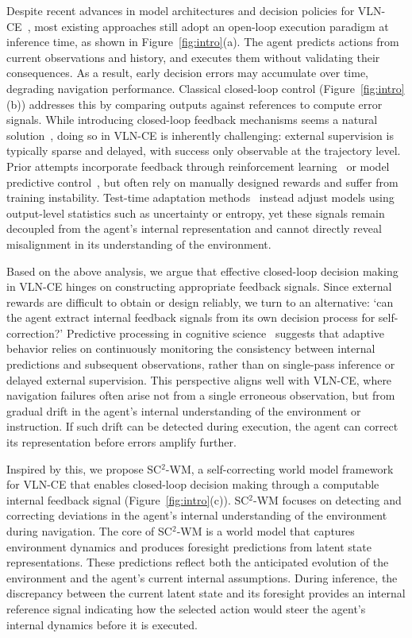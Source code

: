 \documentclass{article}
\theoremstyle{plain}
\theoremstyle{definition}
\theoremstyle{remark}
\begin{document}
Despite recent advances in model architectures and decision policies for VLN-CE~\cite{an2024etpnav,wang2024lookahead}, most existing approaches still adopt an open-loop execution paradigm at inference time, as shown in Figure~\ref{fig:intro}(a).
The agent predicts actions from current observations and history, and executes them without validating their consequences.
As a result, early decision errors may accumulate over time, degrading navigation performance. 
Classical closed-loop control (Figure~\ref{fig:intro}(b)) addresses this by comparing outputs against references to compute error signals.
While introducing closed-loop feedback mechanisms seems a natural solution~\cite{bu2024clover,li2024self}, doing so in VLN-CE is inherently challenging: external supervision is typically sparse and delayed, with success only observable at the trajectory level.
Prior attempts incorporate feedback through reinforcement learning~\cite{wang2024rl} or model predictive control~\cite{dey2025adaptive}, but often rely on manually designed rewards and suffer from training instability.
Test-time adaptation methods~\cite{wang2020tent,gao2024fast} instead adjust models using output-level statistics such as uncertainty or entropy, yet these signals remain decoupled from the agent’s internal representation and cannot directly reveal misalignment in its understanding of the environment.





Based on the above analysis, we argue that effective closed-loop decision making in VLN-CE hinges on constructing appropriate feedback signals.
Since external rewards are difficult to obtain or design reliably, we turn to an alternative: `can the agent extract internal feedback signals from its own decision process for self-correction?'
Predictive processing in cognitive science~\cite{huang2011predictive} suggests that adaptive behavior relies on continuously monitoring the consistency between internal predictions and subsequent observations, rather than on single-pass inference or delayed external supervision.
This perspective aligns well with VLN-CE, where navigation failures often arise not from a single erroneous observation, but from gradual drift in the agent's internal understanding of the environment or instruction.
If such drift can be detected during execution, the agent can correct its representation before errors amplify further.


Inspired by this, we propose SC$^{2}$-WM, a self-correcting world model framework for VLN-CE that enables closed-loop decision making through a computable internal feedback signal (Figure~\ref{fig:intro}(c)).
SC$^{2}$-WM focuses on detecting and correcting deviations in the agent’s internal understanding of the environment during navigation.
The core of SC$^{2}$-WM is a world model that captures environment dynamics and produces foresight predictions from latent state representations.
These predictions reflect both the anticipated evolution of the environment and the agent’s current internal assumptions.
During inference, the discrepancy between the current latent state and its foresight provides an internal reference signal indicating how the selected action would steer the agent's internal dynamics before it is executed.
\end{document}
